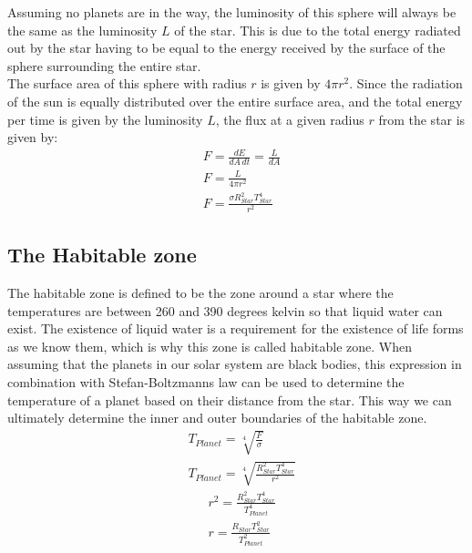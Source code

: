 \documentclass[reprint,english,notitlepage]{revtex4-2}
\begin{document}
Assuming no planets are in the way, the luminosity of this sphere will always be the same as the luminosity $L$ of the star.
This is due to the total energy radiated out by the star having to be equal to the energy received by the surface of the sphere surrounding the entire star.\\
The surface area of this sphere with radius $r$ is given by $4 \pi r^2$.
Since the radiation of the sun is equally distributed over the entire surface area, and the total energy per time is given by the luminosity $L$, the flux at a given radius $r$ from the star is given by:
\begin{align}
    &F = \frac{dE}{dA \, dt} = \frac{L}{dA}\\
	&F = \frac{L}{4 \pi r^2}\\
	&F = \frac{\sigma R_{Star}^2 T_{Star}^4}{r^2} \label{Flux_Distance}
\end{align}

\subsection{The Habitable zone}\label{subsec:temperature-of-planets}
The habitable zone is defined to be the zone around a star where the temperatures are between 260 and 390 degrees kelvin so that liquid water can exist.
The existence of liquid water is a requirement for the existence of life forms as we know them, which is why this zone is called habitable zone.
When assuming that the planets in our solar system are black bodies, this expression in combination with Stefan-Boltzmanns law can be used to determine the temperature of a planet based on their distance from the star.
This way we can ultimately determine the inner and outer boundaries of the habitable zone.
\begin{align}
    &T_{Planet} = \sqrt[4]{\frac{F}{\sigma}}\\
	&T_{Planet} = \sqrt[4]{\frac{R_{Star}^2 T_{Star}^4}{r^2}} \label{Planet_temp}
\end{align}
\begin{align}
	&r^2 = \frac{R_{Star}^2 T_{Star}^4}{T_{Planet}^4}\\
	&r = \frac{R_{Star} T_{Star}^2}{T_{Planet}^2} \label{Radius_temp}
\end{align}
\end{document}
